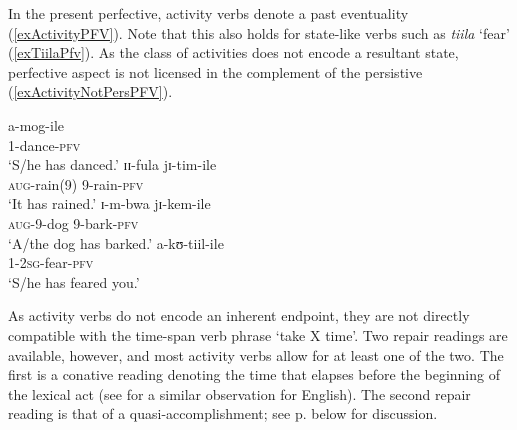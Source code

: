 In the present perfective, activity verbs denote a past eventuality (\ref{exActivityPFV}). Note that this also holds for state-like verbs such as \textit{tiila} \lq  fear' (\ref{exTiilaPfv}). As the class of activities does not encode a resultant state, perfective aspect is not licensed in the complement of the persistive (\ref{exActivityNotPersPFV}).

\begin{exe}
\begin{multicols}{2}
\ex \label{exActivityPFV}
\begin{xlist}
\ex \gll a-mog-ile\\
1-dance-\textsc{pfv}\\
\glt `S/he has danced.'
\ex \gll ɪɪ-fula jɪ-tim-ile\\
\textsc{aug}-rain(9) 9-rain-\textsc{pfv}\\
\glt `It has rained.'
\ex \gll ɪ-m-bwa jɪ-kem-ile\\
\textsc{aug}-9-dog 9-bark-\textsc{pfv}\\
\glt `A/the dog has barked.'
\ex \label{exTiilaPfv}\gll a-kʊ-tiil-ile\\
1-\textsc{2sg}-fear-\textsc{pfv}\\
\glt \lq S/he has feared you.'
\end{xlist}
\end{multicols}
\clearpage
\ex\label{exActivityNotPersPFV} \begin{xlist}
\end{xlist}
\end{exe}

As activity verbs do not encode an inherent endpoint, they are not directly compatible with the time-span verb phrase \lq take X time'. Two repair readings are available, however, and most activity verbs allow for at least one of the two. The first is a conative reading denoting the time that elapses before the beginning of the lexical act (see \citealt[57]{DowtyD1979} for a similar observation for English). The second repair reading is that of a quasi-accomplishment; see p. \pageref{QuasiAccomplishment} below for discussion.

